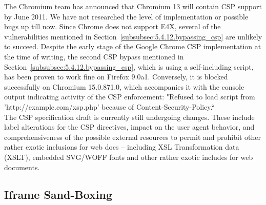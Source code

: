   The Chromium team has announced that Chromium 13 will contain CSP support by June 2011. We have not researched the level of implementation or possible bugs up till now. Since Chrome does not support E4X, several of the vulnerabilities mentioned in Section~\ref{subsubsec:5.4.12.bypassing_csp} are unlikely to succeed. Despite the early stage of the Google Chrome CSP implementation at the time of writing, the second CSP bypass mentioned in Section~\ref{subsubsec:5.4.12.bypassing_csp}, which is using a self-including script, has been proven to work fine on Firefox 9.0a1. Conversely, it is blocked successfully on Chromium 15.0.871.0, which accompanies it with the console output indicating activity of the CSP enforcement: "Refused to load script from 'http://example.com/xsp.php' because of Content-Security-Policy.``\\

  The CSP specification draft is currently still undergoing changes. These include label alterations for the CSP directives, impact on the user agent behavior, and comprehensiveness of the possible external resources to permit and prohibit other rather exotic inclusions for web docs -- including XSL Transformation data (XSLT), embedded SVG/WOFF fonts and other rather exotic includes for web documents.



    \subsection{Iframe Sand-Boxing}
    \label{subsubsec:4.6.2.iframe_sandboxing}


